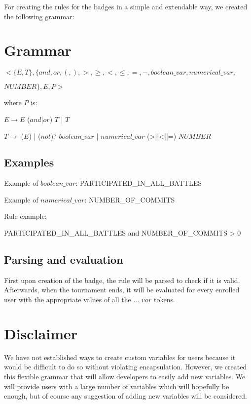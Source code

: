For creating the rules for the badges in a simple and extendable way, we created the following grammar:

\section{Grammar}
$<\{E,T\},\{and, or, (, ), >,\geq,<,\leq,=,-,boolean\_var,numerical\_var,$

$NUMBER\}, E, P>$

where $P$ is:

$E \rightarrow E$ ($and$|$or$) $T$ | $T$

$T \rightarrow $ ($E$) 
| ($not$)? $boolean\_var$ 
| $numerical\_var$ (>|\geq|<|\leq|=) $NUMBER$

\subsection{Examples}
Example of $boolean\_var$: PARTICIPATED\_IN\_ALL\_BATTLES

Example of $numerical\_var$: NUMBER\_OF\_COMMITS

Rule example: 

PARTICIPATED\_IN\_ALL\_BATTLES and NUMBER\_OF\_COMMITS > 0

\subsection{Parsing and evaluation}
First upon creation of the badge, the rule will be parsed to check if it is valid. Afterwards, when the tournament ends, it will be evaluated for every enrolled user with the appropriate values of all the $...\_var$ tokens.

\section{Disclaimer}
We have not established ways to create custom variables for users because it would be difficult to do so without violating encapsulation. However, we created this flexible grammar that will allow developers to easily add new variables. We will provide users with a large number of variables which will hopefully be enough, but of course any suggestion of adding new variables will be considered.
